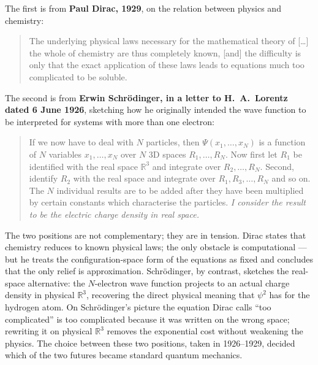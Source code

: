The first is from \textbf{Paul Dirac, 1929}, on the relation between physics and chemistry:

\begin{quote}
The underlying physical laws necessary for the mathematical theory of [\ldots] the whole of chemistry are thus completely known, [and] the difficulty is only that the exact application of these laws leads to equations much too complicated to be soluble.
\end{quote}

The second is from \textbf{Erwin Schr\"odinger, in a letter to H.~A.\ Lorentz dated 6 June 1926}, sketching how he originally intended the wave function to be interpreted for systems with more than one electron:

\begin{quote}
If we now have to deal with $N$ particles, then $\Psi(x_1, \ldots, x_N)$ is a function of $N$ variables $x_1, \ldots, x_N$ over $N$ 3D spaces $R_1, \ldots, R_N$. Now first let $R_1$ be identified with the real space $\mathbb{R}^3$ and integrate over $R_2, \ldots, R_N$. Second, identify $R_2$ with the real space and integrate over $R_1, R_3, \ldots, R_N$ and so on. The $N$ individual results are to be added after they have been multiplied by certain constants which characterise the particles. \emph{I consider the result to be the electric charge density in real space.}
\end{quote}

The two positions are not complementary; they are in tension. Dirac states that chemistry reduces to known physical laws; the only obstacle is computational --- but he treats the configuration-space form of the equations as fixed and concludes that the only relief is approximation. Schr\"odinger, by contrast, sketches the real-space alternative: the $N$-electron wave function projects to an actual charge density in physical $\mathbb{R}^3$, recovering the direct physical meaning that $\psi^2$ has for the hydrogen atom. On Schr\"odinger's picture the equation Dirac calls ``too complicated'' is too complicated because it was written on the wrong space; rewriting it on physical $\mathbb{R}^3$ removes the exponential cost without weakening the physics. The choice between these two positions, taken in 1926--1929, decided which of the two futures became standard quantum mechanics.

